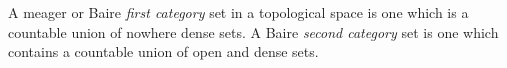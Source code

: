 \documentclass[12pt]{article}
\begin{document}
A meager or Baire \emph{first category} set in a topological space is one which is a countable union of nowhere dense sets. A Baire \emph{second category} set is one which contains a countable union of open and dense sets.
\end{document}
